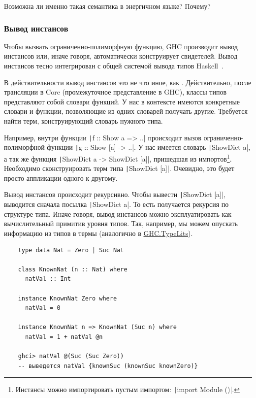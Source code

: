 \begin{task}
    Возможна ли именно такая семантика в энергичном языке?
    Почему?
\end{task}

\subsubsection{Вывод инстансов}

Чтобы вызвать ограниченно-полиморфную функцию, GHC производит вывод инстансов или, иначе говоря, автоматически конструирует свидетелей.
Вывод инстансов тесно интегрирован с общей системой вывода типов Haskell~\cite{spj-type-inference}.

В действительности вывод инстансов это не что иное, как .
Действительно, после трансляции в Core (промежуточное представление в GHC), классы типов представляют собой словари функций.
У нас в контексте имеются конкретные словари и функции, позволяющие из одних словарей получать другие.
Требуется найти терм, конструирующий словарь нужного типа.

Например, внутри функции \texttt|f :: Show a => ..| происходит вызов ограниченно- полиморфной функции
\texttt|g :: Show [a] -> ..|.
У нас имеется словарь \texttt|ShowDict a|, а так же функция \texttt|ShowDict a -> ShowDict [a]|, пришедшая из импортов\footnote{Инстансы можно импортировать пустым импортом: \texttt|import Module ()|.}.
Необходимо сконструировать терм типа \texttt|ShowDict [a]|.
Очевидно, это будет просто аппликации одного к другому.

Вывод инстансов происходит рекурсивно.
Чтобы вывести \texttt|ShowDict [a]|, выводится сначала посылка \texttt|ShowDict a|.
То есть получается рекурсия по структуре типа.
Иначе говоря, вывод инстансов можно эксплуатировать как вычислительный примитив уровня типов.
Так, например, мы можем опускать информацию из типов в термы (аналогично в \href{https://hackage.haskell.org/package/base-4.20.0.1/docs/GHC-TypeLits.html}{GHC.TypeLits}).
\begin{verbatim}
    type data Nat = Zero | Suc Nat

    class KnownNat (n :: Nat) where
      natVal :: Int

    instance KnownNat Zero where
      natVal = 0

    instance KnownNat n => KnownNat (Suc n) where
      natVal = 1 + natVal @n

    ghci> natVal @(Suc (Suc Zero))
    -- выведется natVal {knownSuc (knownSuc knownZero)}
\end{verbatim}


